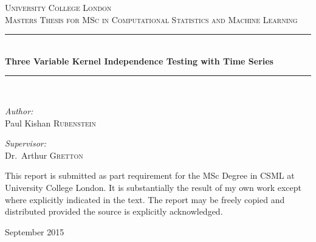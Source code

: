 \documentclass[12pt]{article}
\newcommand{\HRule}{\rule{\linewidth}{0.5mm}}
\numberwithin{claim}{section}
\numberwithin{lemma}{section}
\numberwithin{theorem}{section}
\begin{document}
\onehalfspacing


\begin{titlepage}
\begin{center}


\textsc{\LARGE University College London}\\[1.5cm]

\textsc{\Large Masters Thesis for MSc in Computational Statistics and Machine Learning}\\[0.5cm]

\HRule \\[0.4cm]
{ \huge \bfseries Three Variable Kernel Independence Testing with Time Series \\[0.4cm] }

\HRule \\[1.5cm]

\begin{minipage}{0.4\textwidth}
\begin{flushleft} \large
\emph{Author:}\\
Paul Kishan \textsc{Rubenstein}
\end{flushleft}
\end{minipage}
\begin{minipage}{0.4\textwidth}
\begin{flushright} \large
\emph{Supervisor:} \\
Dr.~Arthur  \textsc{Gretton}
\end{flushright}
\end{minipage}

\vspace{2cm}

This report is submitted as part requirement for the MSc Degree in CSML at University College London. It is substantially the result of my own work except where explicitly indicated in the text. The report may be freely copied and distributed provided the source is explicitly acknowledged.

\vfill

{\large September 2015}

\end{center}
\end{titlepage}
\newpage
{}
\mbox{}
\newpage
\mbox{}
\newpage
\mbox{}
\newpage
\end{document}
